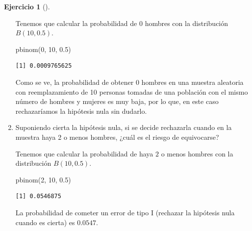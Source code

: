 \documentclass[
  a4paper,
]{scrreport}
\newenvironment{Shaded}{\begin{snugshade}}{\end{snugshade}}
\newcommand{\DecValTok}[1]{\textcolor[rgb]{0.68,0.00,0.00}{#1}}
\newcommand{\FloatTok}[1]{\textcolor[rgb]{0.68,0.00,0.00}{#1}}
\newcommand{\FunctionTok}[1]{\textcolor[rgb]{0.28,0.35,0.67}{#1}}
\newcommand{\NormalTok}[1]{\textcolor[rgb]{0.00,0.23,0.31}{#1}}
\theoremstyle{definition}
\newtheorem{exercise}{Ejercicio}[chapter]
\theoremstyle{remark}
\begin{document}
\begin{exercise}[]
\begin{enumerate}
\begin{tcolorbox}
  Tenemos que calcular la probabilidad de \(0\) hombres con la
  distribución \(B(10, 0.5)\).

\begin{Shaded}
\begin{Highlighting}[]
\FunctionTok{pbinom}\NormalTok{(}\DecValTok{0}\NormalTok{, }\DecValTok{10}\NormalTok{, }\FloatTok{0.5}\NormalTok{)}
\end{Highlighting}
\end{Shaded}

\begin{verbatim}
[1] 0.0009765625
\end{verbatim}

  Como se ve, la probabilidad de obtener 0 hombres en una muestra
  aleatoria con reemplazamiento de 10 personas tomadas de una población
  con el mismo número de hombres y mujeres es muy baja, por lo que, en
  este caso rechazaríamos la hipótesis nula sin dudarlo.

  \end{tcolorbox}
\item
  Suponiendo cierta la hipótesis nula, si se decide rechazarla cuando en
  la muestra haya 2 o menos hombres, ¿cuál es el riesgo de equivocarse?

  \begin{tcolorbox}[enhanced jigsaw, coltitle=black, left=2mm, colback=white, leftrule=.75mm, toptitle=1mm, breakable, bottomrule=.15mm, titlerule=0mm, bottomtitle=1mm, title=\textcolor{quarto-callout-tip-color}{\faLightbulb}\hspace{0.5em}{Solución}, arc=.35mm, toprule=.15mm, rightrule=.15mm, colframe=quarto-callout-tip-color-frame, opacityback=0, colbacktitle=quarto-callout-tip-color!10!white, opacitybacktitle=0.6]

  Tenemos que calcular la probabilidad de haya \(2\) o menos hombres con
  la distribución \(B(10, 0.5)\).

\begin{Shaded}
\begin{Highlighting}[]
\FunctionTok{pbinom}\NormalTok{(}\DecValTok{2}\NormalTok{, }\DecValTok{10}\NormalTok{, }\FloatTok{0.5}\NormalTok{)}
\end{Highlighting}
\end{Shaded}

\begin{verbatim}
[1] 0.0546875
\end{verbatim}

  La probabilidad de cometer un error de tipo I (rechazar la hipótesis
  nula cuando es cierta) es \(0.0547\).


\end{tcolorbox}
\end{enumerate}
\end{exercise}
\end{document}
